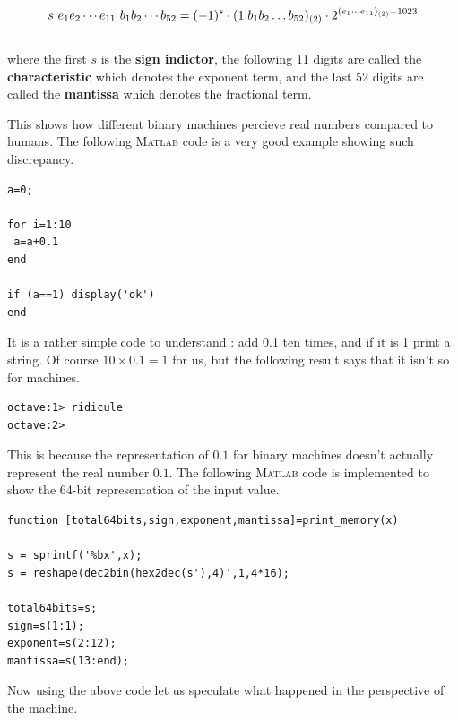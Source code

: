 \documentclass[paper=a4, fontsize=11pt]{scrartcl}
\newcommand{\MATLAB}{\textsc{Matlab}\xspace}
\begin{document}
\begin{equation}\nonumber
	\underbar{$s$} \text{ } \underbar{$e_1 e_2 \cdots e_{11} $} \text{ }  \underbar{$b_1 b_2 \cdots b_{52} $}  = (-1)^{s} \cdot (1.b_1 b_2 \dots b_{52})_{(2)} \cdot 2^{(e_1 \cdots e_{11})_{(2)}-1023}
\end{equation} \\

where the first $s$ is the \textbf{sign indictor}, the following 11 digits are called the \textbf{characteristic} which denotes the exponent term, and the last 52 digits are called the \textbf{mantissa} which denotes the fractional term. 

This shows how different binary machines percieve real numbers compared to humans. The following \MATLAB code is a very good example showing such discrepancy.\\

\begin{lstlisting}[label=ridicule.m,caption=ridicule.m]
a=0;

for i=1:10
 a=a+0.1  
end

if (a==1) display('ok')
end
\end{lstlisting} 
\vspace{0.15in}

It is a rather simple code to understand : add 0.1 ten times, and if it is 1 print a string. Of course $10 \times 0.1 = 1$ for us, but the following result says that it isn't so for machines.

\begin{verbatim}
octave:1> ridicule
octave:2> 
\end{verbatim} 

This is because the representation of $0.1$ for binary machines doesn't actually represent the real number $0.1$. The following \MATLAB code is implemented to show the 64-bit representation of the input value.\\

\begin{lstlisting}[label=printmem, caption=print\_memory.m]
function [total64bits,sign,exponent,mantissa]=print_memory(x)

s = sprintf('%bx',x);
s = reshape(dec2bin(hex2dec(s'),4)',1,4*16);

total64bits=s;
sign=s(1:1);
exponent=s(2:12);
mantissa=s(13:end);
\end{lstlisting}
\vspace{0.15in}

Now using the above code let us speculate what happened in the perspective of the machine.
\end{document}
